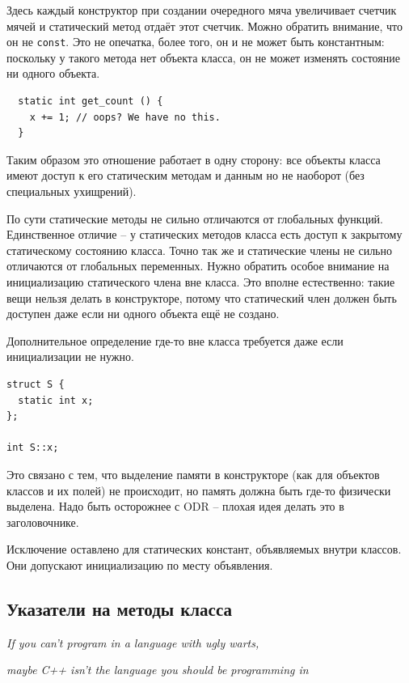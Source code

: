 \documentclass[a4paper,12pt,oneside]{book}
\begin{document}
Здесь каждый конструктор при создании очередного мяча увеличивает счетчик мячей и статический метод отдаёт этот счетчик. Можно обратить внимание, что он не \lstinline!const!. Это не опечатка, более того, он и не может быть константным: поскольку у такого метода нет объекта класса, он не может изменять состояние ни одного объекта.

\begin{lstlisting}
  static int get_count () { 
    x += 1; // oops? We have no this.
  }
\end{lstlisting}

Таким образом это отношение работает в одну сторону: все объекты класса имеют доступ к его статическим методам и данным но не наоборот (без специальных ухищрений).

По сути статические методы не сильно отличаются от глобальных функций. Единственное отличие -- у статических методов класса есть доступ к закрытому статическому состоянию класса. Точно так же и статические члены не сильно отличаются от глобальных переменных. Нужно обратить особое внимание на инициализацию статического члена вне класса. Это вполне естественно: такие вещи нельзя делать в  конструкторе, потому что статический член должен быть доступен даже если ни одного объекта ещё не создано.

Дополнительное определение где-то вне класса требуется даже если инициализации не нужно.

\begin{lstlisting}
struct S {
  static int x;
};

int S::x;
\end{lstlisting}

Это связано с тем, что выделение памяти в конструкторе (как для объектов классов и их полей) не происходит, но память должна быть где-то физически выделена. Надо быть осторожнее с ODR -- плохая идея делать это в заголовочнике.

Исключение оставлено для статических констант, объявляемых внутри классов. Они допускают инициализацию по месту объявления.

\subsection{Указатели на методы класса}

\hfill\textit{If you can’t program in a language with ugly warts,}

\hfill\textit{maybe C++ isn’t the language you should be programming in} {\vspace{0.5em}}
\end{document}
